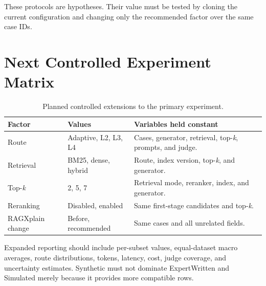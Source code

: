 These protocols are hypotheses. Their value must be tested by cloning the
current configuration and changing only the recommended factor over the same
case IDs.

\section{Next Controlled Experiment Matrix}

\begin{table}[H]
  \centering
  \caption{Planned controlled extensions to the primary experiment.}
  \label{tab:future-experiment-matrix}
  \begin{tabularx}{\textwidth}{p{}p{}X}
    \toprule
    Factor & Values & Variables held constant\\
    \midrule
    Route & Adaptive, L2, L3, L4 & Cases, generator, retrieval, top-\textit{k}, prompts, and judge.\\
    Retrieval & BM25, dense, hybrid & Route, index version, top-\textit{k}, and generator.\\
    Top-\textit{k} & 2, 5, 7 & Retrieval mode, reranker, index, and generator.\\
    Reranking & Disabled, enabled & Same first-stage candidates and top-\textit{k}.\\
    RAGXplain change & Before, recommended & Same cases and all unrelated fields.\\
    \bottomrule
  \end{tabularx}
\end{table}

Expanded reporting should include per-subset values, equal-dataset macro
averages, route distributions, tokens, latency, cost, judge coverage, and
uncertainty estimates. Synthetic must not dominate ExpertWritten and Simulated
merely because it provides more compatible rows.
